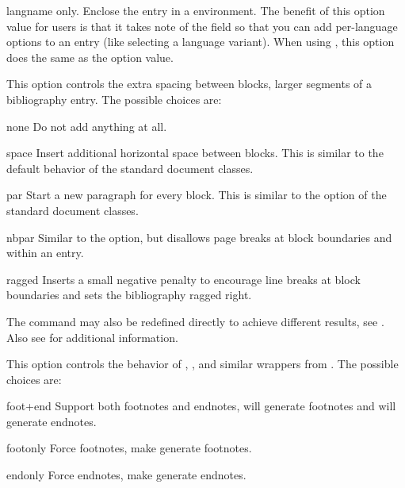\documentclass{ltxdockit}[2011/03/25]
\begin{document}
\begin{optionlist}
\begin{valuelist}
\item[langname]
 only. Enclose the entry in a  environment. The benefit of this option value for  users is that it takes note of the  field so that you can add per-language options to an entry (like selecting a language variant). When using , this option does the same as the  option value.

\end{valuelist}


This option controls the extra spacing between blocks, \ie larger segments of a bibliography entry. The possible choices are:

\begin{valuelist}

\item[none] Do not add anything at all.

\item[space] Insert additional horizontal space between blocks. This is similar to the default behavior of the standard \latex document classes.

\item[par] Start a new paragraph for every block. This is similar to the  option of the standard \latex document classes.

\item[nbpar] Similar to the  option, but disallows page breaks at block boundaries and within an entry.

\item[ragged] Inserts a small negative penalty to encourage line breaks at block boundaries and sets the bibliography ragged right.

\end{valuelist}

The  command may also be redefined directly to achieve different results, see . Also see  for additional information.


This option controls the behavior of , , and similar wrappers from . The possible choices are:

\begin{valuelist}
\item[foot+end] Support both footnotes and endnotes, \ie {} will generate footnotes and  will generate endnotes.
\item[footonly] Force footnotes, \ie make  generate footnotes.
\item[endonly] Force endnotes, \ie make  generate endnotes.
\end{valuelist}


\end{optionlist}
\end{document}
